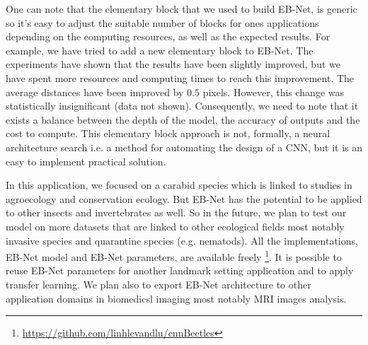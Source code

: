 \documentclass[review]{elsarticle}
\begin{document}
One can note that the elementary block that we used to build EB-Net, is generic so it's easy to adjust the suitable number of blocks for ones applications depending on the computing resources, as well as the expected results. For example, we have tried to add a new elementary block to EB-Net. The experiments have shown that the results have been slightly improved, but we have spent more resources and computing times to reach this improvement. The average distances have been improved by $0.5$ pixels. However, this change was statistically insignificant (data not shown). Consequently, we need to note that it exists a balance between the depth of the model, the accuracy of outputs and the cost to compute.
This elementary block approach is not, formally, a  neural architecture search \cite{elsken_neural_2019} i.e. a method for automating the design of a CNN,  but it is an easy to implement practical solution.

In this application, we focused on a carabid species which is linked to studies in agroecology and conservation ecology. But EB-Net has the potential to be applied to other insects and invertebrates as well.
So in the future, we plan to test our model on more  
datasets that are linked to other ecological fields most notably invasive species and quarantine species (e.g. nematods). All the implementations, EB-Net model and EB-Net parameters, are available freely \footnote{\url{ https://github.com/linhlevandlu/cnnBeetles}}. It is possible to reuse EB-Net parameters for another landmark setting application and to apply transfer learning. We plan also to export EB-Net architecture to other application domains in biomedicsl imaging most notably MRI images analysis. 



\end{document}
